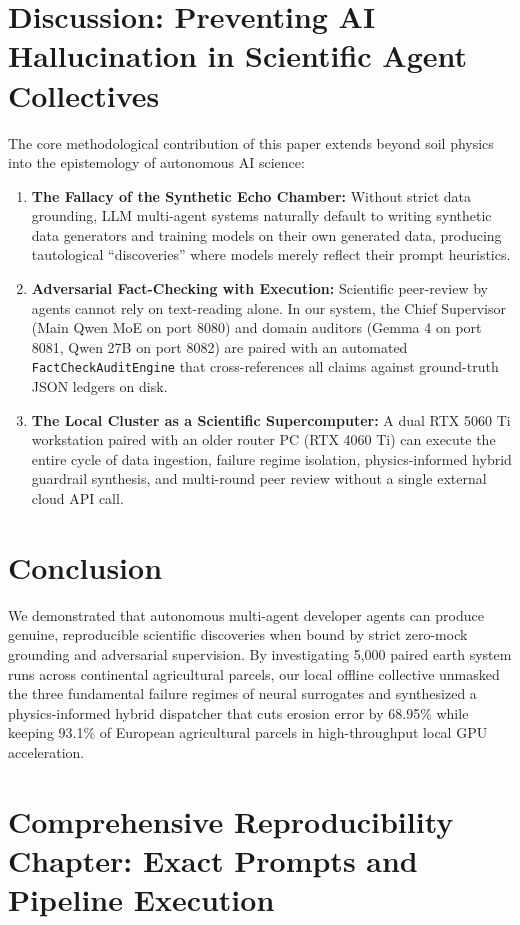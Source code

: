 \documentclass[11pt,a4paper]{article}
\begin{document}
\section{Discussion: Preventing AI Hallucination in Scientific Agent Collectives}
The core methodological contribution of this paper extends beyond soil physics into the epistemology of autonomous AI science:
\begin{enumerate}
    \item \textbf{The Fallacy of the Synthetic Echo Chamber:} Without strict data grounding, LLM multi-agent systems naturally default to writing synthetic data generators and training models on their own generated data, producing tautological ``discoveries'' where models merely reflect their prompt heuristics.
    \item \textbf{Adversarial Fact-Checking with Execution:} Scientific peer-review by agents cannot rely on text-reading alone. In our system, the Chief Supervisor (Main Qwen MoE on port 8080) and domain auditors (Gemma 4 on port 8081, Qwen 27B on port 8082) are paired with an automated \texttt{FactCheckAuditEngine} that cross-references all claims against ground-truth JSON ledgers on disk.
    \item \textbf{The Local Cluster as a Scientific Supercomputer:} A dual RTX 5060 Ti workstation paired with an older router PC (RTX 4060 Ti) can execute the entire cycle of data ingestion, failure regime isolation, physics-informed hybrid guardrail synthesis, and multi-round peer review without a single external cloud API call.
\end{enumerate}

\section{Conclusion}
We demonstrated that autonomous multi-agent developer agents can produce genuine, reproducible scientific discoveries when bound by strict zero-mock grounding and adversarial supervision. By investigating 5,000 paired earth system runs across continental agricultural parcels, our local offline collective unmasked the three fundamental failure regimes of neural surrogates and synthesized a physics-informed hybrid dispatcher that cuts erosion error by 68.95\% while keeping 93.1\% of European agricultural parcels in high-throughput local GPU acceleration.

\section{Comprehensive Reproducibility Chapter: Exact Prompts and Pipeline Execution}
\end{document}
